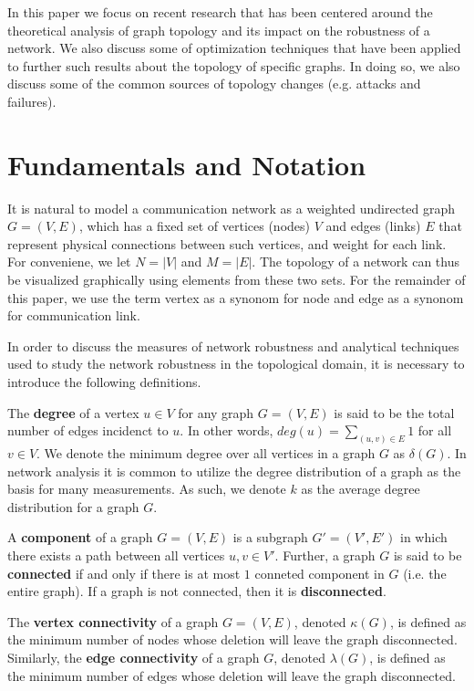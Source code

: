 \documentclass[doc]{apa}%
\begin{document}
In this paper we focus on recent research that has been centered around the theoretical analysis of graph topology and its impact on the robustness of a network. We also discuss some of optimization techniques that have been applied to further such results about the topology of specific graphs. In doing so, we also discuss some of the common sources of topology changes (e.g. attacks and failures). 

\section{Fundamentals and Notation}

It is natural to model a communication network as a weighted undirected graph $G = (V,E)$, which has a fixed set of vertices (nodes) $V$ and edges (links) $E$ that represent physical connections between such vertices, and weight for each link. For conveniene, we let $N = |V|$ and $M = |E|$. The topology of a network can thus be visualized graphically using elements from these two sets. For the remainder of this paper, we use the term vertex as a synonom for node and edge as a synonom for communication link. 

In order to discuss the measures of network robustness and analytical techniques used to study the network robustness in the topological domain, it is necessary to introduce the following definitions.

\begin{define}
The \textbf{degree} of a vertex $u \in V$ for any graph $G = (V,E)$ is said to be the total number of edges incidenct to $u$. In other words, $deg(u) = \sum_{(u,v) \in E} 1$ for all $v \in V$. We denote the minimum degree over all vertices in a graph $G$ as $\delta(G)$. In network analysis it is common to utilize the degree distribution of a graph as the basis for many measurements. As such, we denote $k$ as the average degree distribution for a graph $G$.
\end{define}

\begin{define}
A \textbf{component} of a graph $G = (V,E)$ is a subgraph $G' = (V',E')$ in which there exists a path between all vertices $u, v \in V'$. Further, a graph $G$ is said to be \textbf{connected} if and only if there is at most $1$ conneted component in $G$ (i.e. the entire graph). If a graph is not connected, then it is \textbf{disconnected}.
\end{define}

\begin{define}
The \textbf{vertex connectivity} of a graph $G = (V,E)$, denoted $\kappa(G)$, is defined as the minimum number of nodes whose deletion will leave the graph disconnected. Similarly, the \textbf{edge connectivity} of a graph $G$, denoted $\lambda(G)$, is defined as the minimum number of edges whose deletion will leave the graph disconnected.
\end{define}
\end{document}
